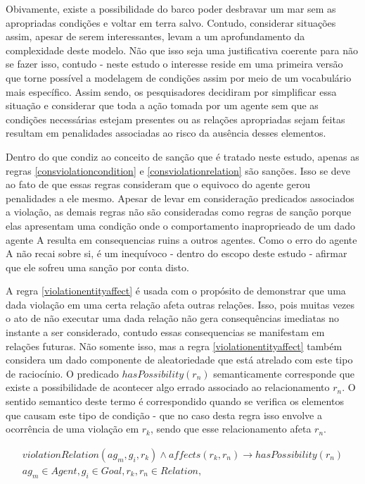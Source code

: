 Obivamente, existe a possibilidade do barco poder desbravar
um mar sem as apropriadas condições e voltar em terra salvo. Contudo, considerar situações assim, apesar de serem interessantes, levam a um aprofundamento 
da complexidade deste modelo. Não que isso seja uma justificativa coerente para não se fazer isso, contudo - neste estudo o interesse reside em uma 
primeira versão que torne possível a modelagem de condições assim por meio de um vocabulário mais específico. Assim sendo, os pesquisadores decidiram 
por simplificar essa situação e considerar que toda a ação tomada por um agente sem que as condições necessárias estejam presentes ou as relações apropriadas 
sejam feitas resultam em penalidades associadas ao risco da ausência desses elementos.  

Dentro do que condiz ao conceito de sanção que é tratado neste estudo, apenas as regras \ref{consviolationcondition} e \ref{consviolationrelation} são sanções. 
Isso se deve ao fato de que essas regras consideram que o equivoco do agente gerou penalidades a ele mesmo. Apesar de levar em consideração predicados associados 
a violação, as demais regras não são consideradas como regras de sanção porque elas apresentam uma condição onde o comportamento inaproprieado de um dado 
agente A resulta em consequencias ruins a outros agentes. Como o erro do agente A não recai sobre si, é um inequívoco - dentro do escopo deste estudo - afirmar 
que ele sofreu uma sanção por conta disto. 


A regra \ref{violationentityaffect} é usada com o propósito de demonstrar que uma dada violação em uma certa relação afeta outras relações. Isso, pois 
muitas vezes o ato de não executar uma dada relação não gera consequências imediatas no instante a ser considerado, contudo essas consequencias se 
manifestam em relações futuras. Não somente isso, mas a regra \ref{violationentityaffect} também considera um dado componente de 
aleatoriedade que está atrelado com este tipo de raciocínio. O predicado $hasPossibility(r_n)$ semanticamente corresponde que existe a possibilidade 
de acontecer algo errado associado ao relacionamento $r_n$. O sentido semantico deste termo é correspondido quando se verifica os elementos que 
causam este tipo de condição - que no caso desta regra isso envolve a ocorrência de uma violação em $r_k$, sendo que esse relacionamento afeta $r_n$.


\begin{eqnarray}\label{violationentityaffect}
	violationRelation(ag_m,g_i,r_k) \wedge affects(r_k,r_n) \to hasPossibility(r_n)  \nonumber \\
    ag_m \in Agent, g_i \in Goal, r_k,r_n \in Relation, 
\end{eqnarray}

